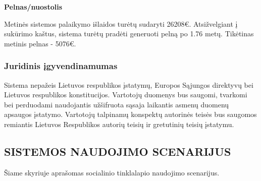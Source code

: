 \documentclass{VUMIFPSkursinis}
\begin{document}
\textbf{Pelnas/nuostolis}

Metinės sistemos palaikymo išlaidos turėtų sudaryti 26208€. Atsižvelgiant į sukūrimo kaštus, sistema turėtų pradėti generuoti pelną po 1.76 metų. Tikėtinas metinis pelnas - 5076€.

\subsubsection{Juridinis įgyvendinamumas}

 Sistema nepažeis Lietuvos respublikos įstatymų, Europos Sąjungos direktyvų bei Lietuvos respublikos konstitucijos. Vartotojų duomenys bus saugomi, tvarkomi bei perduodami naudojantis užšifruota sąsaja laikantis asmenų duomenų apsaugos įstatymo. Vartotojų talpinamų konspektų autorinės teisės bus saugomos remiantis Lietuvos Respublikos autorių teisių ir gretutinių teisių įstatymu. 

\newpage

\subsection{SISTEMOS NAUDOJIMO SCENARIJUS}
Šiame skyriuje aprašomas socialinio tinklalapio naudojimo scenarijus.
\end{document}
